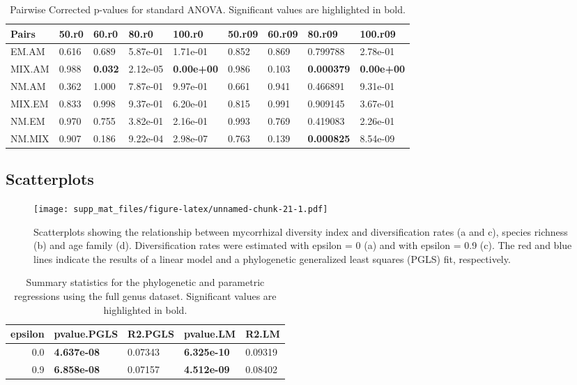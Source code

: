 \documentclass[]{article}
\begin{document}
\begin{table}[H]

\caption{\label{tab:unnamed-chunk-20}Pairwise Corrected p-values for standard ANOVA. Significant values are highlighted in bold.}
\centering
\begin{tabular}{l|l|l|l|l|l|l|l|l}
\hline
Pairs & 50.r0 & 60.r0 & 80.r0 & 100.r0 & 50.r09 & 60.r09 & 80.r09 & 100.r09\\
\hline
EM.AM & 0.616 & 0.689 & 5.87e-01 & 1.71e-01 & 0.852 & 0.869 & 0.799788 & 2.78e-01\\
\hline
MIX.AM & 0.988 & \textbf{0.032} & 2.12e-05 & \textbf{0.00e+00} & 0.986 & 0.103 & \textbf{0.000379} & \textbf{0.00e+00}\\
\hline
NM.AM & 0.362 & 1.000 & 7.87e-01 & 9.97e-01 & 0.661 & 0.941 & 0.466891 & 9.31e-01\\
\hline
MIX.EM & 0.833 & 0.998 & 9.37e-01 & 6.20e-01 & 0.815 & 0.991 & 0.909145 & 3.67e-01\\
\hline
NM.EM & 0.970 & 0.755 & 3.82e-01 & 2.16e-01 & 0.993 & 0.769 & 0.419083 & 2.26e-01\\
\hline
NM.MIX & 0.907 & 0.186 & 9.22e-04 & 2.98e-07 & 0.763 & 0.139 & \textbf{0.000825} & 8.54e-09\\
\hline
\end{tabular}
\end{table}

\hypertarget{scatterplots}{%
\subsection{Scatterplots}\label{scatterplots}}

\begin{figure}
\centering
\texttt{[image: supp\_mat\_files/figure-latex/unnamed-chunk-21-1.pdf]}
\caption{Scatterplots showing the relationship between mycorrhizal
diversity index and diversification rates (a and c), species richness
(b) and age family (d). Diversification rates were estimated with
epsilon = 0 (a) and with epsilon = 0.9 (c). The red and blue lines
indicate the results of a linear model and a phylogenetic generalized
least squares (PGLS) fit, respectively.}
\end{figure}

\begin{table}[H]

\caption{\label{tab:unnamed-chunk-22}Summary statistics for the phylogenetic and parametric regressions using the full genus dataset. Significant values are highlighted in bold.}
\centering
\begin{tabular}{r|l|l|l|l}
\hline
epsilon & pvalue.PGLS & R2.PGLS & pvalue.LM & R2.LM\\
\hline
0.0 & \textbf{4.637e-08} & 0.07343 & \textbf{6.325e-10} & 0.09319\\
\hline
0.9 & \textbf{6.858e-08} & 0.07157 & \textbf{4.512e-09} & 0.08402\\
\hline
\end{tabular}
\end{table}
\end{document}

